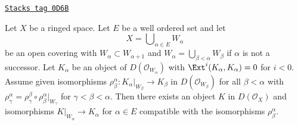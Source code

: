 \begin{lemma}
\label{cohomology-lemma-glueing-increasing-union}
\href{https://stacks.math.columbia.edu/tag/0D6B}{\texttt{Stacks tag 0D6B}}

Let $X$ be a ringed space. Let $E$ be a well ordered set and let
$$
X = \bigcup\nolimits_{\alpha \in E} W_\alpha
$$
be an open covering with $W_\alpha \subset W_{\alpha + 1}$
and $W_\alpha = \bigcup_{\beta < \alpha} W_\beta$ if $\alpha$ is not
a successor. Let $K_\alpha$ be an object of $D(\mathcal{O}_{W_\alpha})$
with $\Ext^i(K_\alpha, K_\alpha) = 0$ for $i < 0$.
Assume given isomorphisms
$\rho_\beta^\alpha :  K_\alpha|_{W_\beta} \to K_\beta$ in
$D(\mathcal{O}_{W_\beta})$ for all $\beta < \alpha$ with
$\rho_\gamma^\alpha = \rho_\gamma^\beta \circ \rho^\alpha_\beta|_{W_\gamma}$
for $\gamma < \beta < \alpha$.
Then there exists an object
$K$ in $D(\mathcal{O}_X)$ and isomorphisms
$K|_{W_\alpha} \to K_\alpha$ for $\alpha \in E$
compatible with the isomorphisms $\rho_\beta^\alpha$.
\end{lemma}

